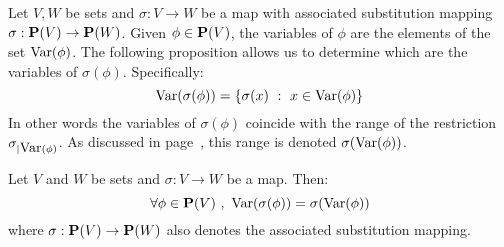 Let $V,W$ be sets and $\sigma:V\to W$ be a map with associated
substitution mapping $\sigma:\mbox{${\bf P}(V)$}\to{\bf P}(W)$. Given $\phi\in\mbox{${\bf P}(V)$}$,
the variables of $\phi$ are the elements of the set $\mbox{\rm Var}(\phi)$.
The following proposition allows us to determine which are the
variables of $\sigma(\phi)$. Specifically:
    \[
    \var(\sigma(\phi))=\{\sigma(x)\ :\ x\in\var(\phi)\}
    \]
In other words the variables of $\sigma(\phi)$ coincide with the
range of the restriction $\sigma_{|\mbox{\rm Var}(\phi)}$. As discussed in
page~\pageref{logic:lemma:pullback}, this range is denoted
$\sigma(\mbox{\rm Var}(\phi))$.
\begin{prop}\label{logic:prop:var:of:substitution}
Let $V$ and $W$ be sets and $\sigma:V\to W$ be a map. Then:
    \[
        \forall\phi\in\pv\ ,\ \var(\sigma(\phi))
        =
        \sigma(\var(\phi))
    \]
where $\sigma:\mbox{${\bf P}(V)$}\to{\bf P}(W)$ also denotes the associated substitution mapping.
\end{prop}
